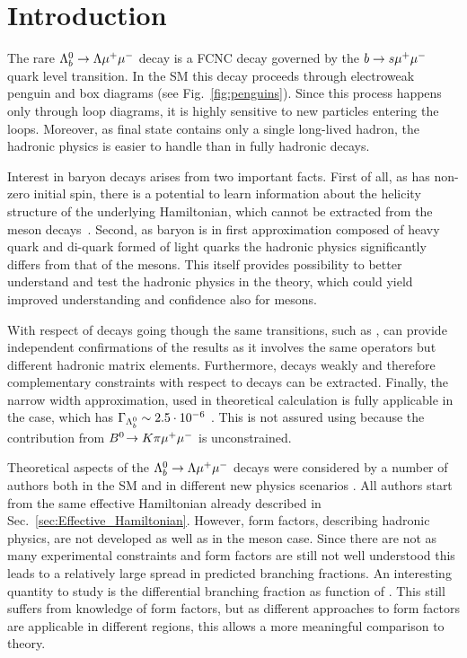 \chapter{Introduction}
\label{sec:Introduction}

The rare ${{\Lambda}^0_{b}}\rightarrow{\ensuremath{\Lambda}}{\ensuremath{\mu^+\mu^-}}$ decay is a FCNC decay governed by the ${b} \rightarrow {\ensuremath{s}}{\ensuremath{\mu^+\mu^-}}$ quark
level transition. In the SM this decay proceeds through electroweak penguin and \W box diagrams
(see Fig.~\ref{fig:penguins}). Since this process happens only through loop diagrams, it is highly sensitive
to new particles entering the loops. Moreover, as final state contains only a single long-lived hadron,
the hadronic physics is easier to handle than in fully hadronic decays.

Interest in \Lb baryon decays arises from two important facts.
First of all, as \Lb has non-zero initial spin, there is a potential to learn information about the helicity structure
of the underlying Hamiltonian, which cannot be extracted from the meson decays~\cite{Hiller:2007ur,Mannel:1997xy}.
Second, as \Lb baryon is in first approximation
composed of heavy quark and di-quark formed of light quarks the hadronic physics significantly differs from that of the mesons.
This itself provides possibility to better understand and test the hadronic physics in the theory,
which could yield improved understanding and confidence also for mesons.

With respect of \Bz decays going though the same transitions, such as \BdToKstmm, \Lz can provide independent
confirmations of the results as it involves the same operators but different hadronic matrix elements.
Furthermore, \Lz decays weakly and therefore complementary constraints with respect to \Bz decays can be extracted.
Finally, the narrow width approximation, used in theoretical calculation is fully applicable in the \Lb case,
which has $\Gamma_{{{\Lambda}^0_{b}}} \sim 2.5 \cdot 10^{-6}$ \ev. This is not assured using \BdToKstmm because
the contribution from $\decay{\Bz}{K\pi\mumu}$ is unconstrained.

Theoretical aspects of the ${{\Lambda}^0_{b}}\rightarrow{\ensuremath{\Lambda}}{\ensuremath{\mu^+\mu^-}}$ decays were considered by a number of authors both in the SM and in different new physics scenarios
\cite{Aslam:2008hp,Wang:2008sm,Huang:1998ek,Chen:2001ki,Chen:2001zc,Chen:2001sj,Zolfagharpour:2007eh,Mott:2011cx,Aliev:2010uy,Mohanta:2010eb,Sahoo:2011yb}.
All authors start from the same effective Hamiltonian already described in Sec.~\ref{sec:Effective_Hamiltonian}. However, form factors, describing hadronic physics, are not developed as well as in the meson case.
Since there are not as many experimental constraints and form factors are still not well understood this leads to a relatively
large spread in predicted branching fractions. An interesting quantity to study is the differential branching fraction as
function of \qsq. This still suffers from knowledge of form factors, but as different
approaches to form factors are applicable in different \qsq regions, this allows a more meaningful comparison to theory.

